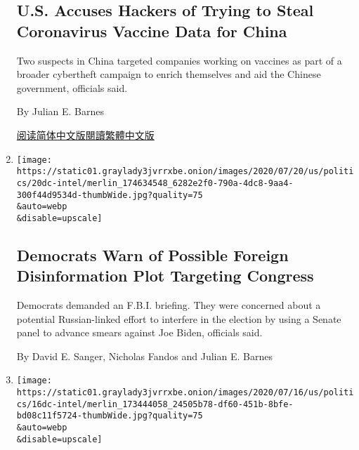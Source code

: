 \begin{enumerate}
  \hypertarget{us-accuses-hackers-of-trying-to-steal-coronavirus-vaccine-data-for-china}{%
  \subsection{U.S. Accuses Hackers of Trying to Steal Coronavirus
  Vaccine Data for
  China}\label{us-accuses-hackers-of-trying-to-steal-coronavirus-vaccine-data-for-china}}

  Two suspects in China targeted companies working on vaccines as part
  of a broader cybertheft campaign to enrich themselves and aid the
  Chinese government, officials said.

  By Julian E. Barnes

  \href{https://cn.nytimes3xbfgragh.onion/usa/20200722/china-hacking-coronavirus-vaccine/}{阅读简体中文版}\href{https://cn.nytimes3xbfgragh.onion/usa/20200722/china-hacking-coronavirus-vaccine/zh-hant/}{閱讀繁體中文版}
\item
  \href{/2020/07/20/us/politics/congress-disinformation-biden-russia-ukraine.html}{}

  \texttt{[image: https://static01.graylady3jvrrxbe.onion/images/2020/07/20/us/politics/20dc-intel/merlin\_174634548\_6282e2f0-790a-4dc8-9aa4-300f44d9534d-thumbWide.jpg?quality=75\\\&auto=webp\\\&disable=upscale]}

  \hypertarget{democrats-warn-of-possible-foreign-disinformation-plot-targeting-congress}{%
  \subsection{Democrats Warn of Possible Foreign Disinformation Plot
  Targeting
  Congress}\label{democrats-warn-of-possible-foreign-disinformation-plot-targeting-congress}}

  Democrats demanded an F.B.I. briefing. They were concerned about a
  potential Russian-linked effort to interfere in the election by using
  a Senate panel to advance smears against Joe Biden, officials said.

  By David E. Sanger, Nicholas Fandos and Julian E. Barnes
\item
  \href{/2020/07/16/us/politics/vaccine-hacking-russia.html}{}

  \texttt{[image: https://static01.graylady3jvrrxbe.onion/images/2020/07/16/us/politics/16dc-intel/merlin\_173444058\_24505b78-df60-451b-8bfe-bd08c11f5724-thumbWide.jpg?quality=75\\\&auto=webp\\\&disable=upscale]}

  \hypertarget{russia-is-trying-to-steal-virus-vaccine-data-western-nations-say}{%
}
\end{enumerate}
